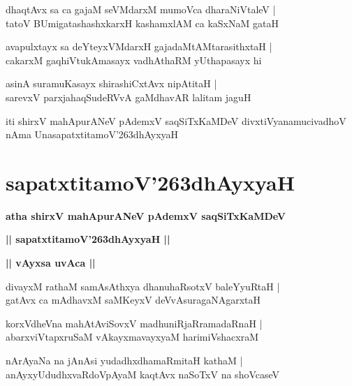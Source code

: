 \documentclass[twoside,12pt,openright]{book}
\def\S{\char'263}
\newcounter{shloka}[chapter]
\def\uvaca#1{\centerline{{\large\textbf{#1}}}}
\begin{document}
\begin{shloka}%
dhaqtAvx sa ca gajaM seVMdarxM mumoVca dharaNiVtaleV |\\
tatoV BUmigatashashxkarxH kashamxlAM ca kaSxNaM gataH
\end{shloka}

\begin{shloka}%
avapulxtayx sa deYteyxVMdarxH gajadaMtAMtarasithxtaH |\\
cakarxM gaqhiVtukAmasayx vadhAthaRM yUthapasayx hi 
\end{shloka}

\begin{shloka}%
asinA suramuKasayx shirashiCxtAvx nipAtitaH |\\
sarevxV parxjahaqSudeRVvA gaMdhavAR lalitam jaguH 
\end{shloka}

\begin{center}
iti shirxV mahApurANeV pAdemxV saqSiTxKaMDeV divxtiVyanamucivadhoV nAma UnasapatxtitamoV\S dhAyxyaH
\end{center}

\chapter{sapatxtitamoV\S dhAyxyaH}

\begin{center}
{\LARGE\bfseries atha shirxV mahApurANeV pAdemxV saqSiTxKaMDeV}
\end{center}

\begin{center}
{\LARGE\bfseries || sapatxtitamoV\S dhAyxyaH || }
\end{center}

\uvaca{|| vAyxsa uvAca ||}

\begin{shloka}%
divayxM rathaM samAsAthxya dhanuhaRsotxV baleYyuRtaH |\\
gatAvx ca mAdhavxM saMKeyxV deVvAsuragaNAgarxtaH
\end{shloka}

\begin{shloka}%
korxVdheVna mahAtAviSovxV madhuniRjaRramadaRnaH |\\
abarxviVtapxruSaM vAkayxmavayxyaM harimiVshacxraM 
\end{shloka}

\begin{shloka}%
nArAyaNa na jAnAsi yudadhxdhamaRmitaH kathaM |\\
anAyxyUdudhxvaRdoVpAyaM kaqtAvx naSoTxV na shoVcaseV 
\end{shloka}
\end{document}
